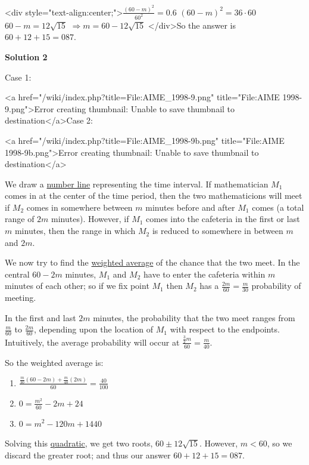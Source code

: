 \begin{enumerate}
 <div style="text-align:center;">$\frac{(60-m)^2}{60^2} = 0.6$
$(60-m)^2 = 36\cdot 60$
$60 - m = 12\sqrt{15}$
$\Rightarrow m = 60-12\sqrt{15}$
</div>So the answer is $60 + 12 + 15 = 087$.

 



\textbf{Solution 2}

Case 1:

 <a href="/wiki/index.php?title=File:AIME\_1998-9.png" title="File:AIME 1998-9.png">Error creating thumbnail: Unable to save thumbnail to destination</a>Case 2:

 <a href="/wiki/index.php?title=File:AIME\_1998-9b.png" title="File:AIME 1998-9b.png">Error creating thumbnail: Unable to save thumbnail to destination</a>

 We draw a \href{https://artofproblemsolving.com/wiki/index.php?title=Number\_line}{number line} representing the time interval. If mathematician $M_1$ comes in at the center of the time period, then the two mathematicions will meet if $M_2$ comes in somewhere between $m$ minutes before and after $M_1$ comes (a total range of $2m$ minutes). However, if $M_1$ comes into the cafeteria in the first or last $m$ minutes, then the range in which $M_2$ is reduced to somewhere in between $m$ and $2m$.

 We now try to find the \href{https://artofproblemsolving.com/wiki/index.php?title=Weighted\_average}{weighted average} of the chance that the two meet. In the central $60-2m$ minutes, $M_1$ and $M_2$ have to enter the cafeteria within $m$ minutes of each other; so if we fix point $M_1$ then $M_2$ has a $\frac{2m}{60} = \frac{m}{30}$ probability of meeting.

 In the first and last $2m$ minutes, the probability that the two meet ranges from $\frac{m}{60}$ to $\frac{2m}{60}$, depending upon the location of $M_1$ with respect to the endpoints. Intuitively, the average probability will occur at $\frac{\frac{3}{2}m}{60} = \frac{m}{40}$.

 So the weighted average is:

 
            \begin{enumerate}[label=(\roman*)]
                \item $\frac{\frac{m}{30}(60-2m) + \frac{m}{40}(2m)}{60} = \frac{40}{100}$\item $0 = \frac{m^2}{60} - 2m + 24$\item $0 = m^2 - 120m + 1440$
            \end{enumerate}
            Solving this \href{https://artofproblemsolving.com/wiki/index.php?title=Quadratic\_equation}{quadratic}, we get two roots, $60 \pm 12\sqrt{15}$. However, $m < 60$, so we discard the greater root; and thus our answer $60 + 12 + 15 = 087$.


\end{enumerate}
